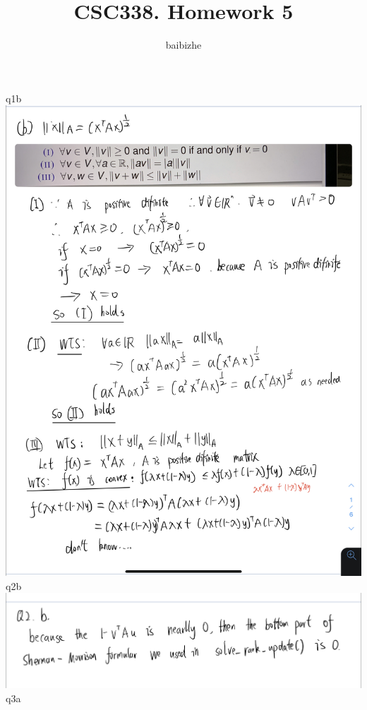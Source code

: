 \documentclass[18pt]{article}
\author{baibizhe}
\title{CSC338. Homework 5}
\begin{document}
\maketitle
\vspace{1.5cm}
\noindent
    q1b\\
    \includegraphics[scale=0.25]{q1b.jpg}\\
\clearpage
    q2b\\
    \includegraphics[scale=0.3]{q2b.jpg}\\
    q3a\\
\end{document}
